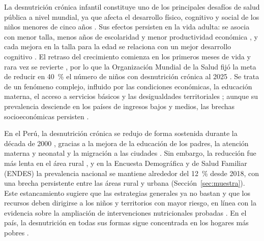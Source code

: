\documentclass[final,5p,times,twocolumn,number,lefttitle]{elsarticle}
\begin{document}
La desnutrición crónica infantil constituye uno de los principales desafíos de salud pública a nivel mundial, ya que afecta el desarrollo físico, cognitivo y social de los niños menores de cinco años \citep{black2013lancet,victora2021lancet}. Sus efectos persisten en la vida adulta: se asocia con menor talla, menos años de escolaridad y menor productividad económica \citep{victora2008consequences}, y cada mejora en la talla para la edad se relaciona con un mejor desarrollo cognitivo \citep{sudfeld2015growth}. El retraso del crecimiento comienza en los primeros meses de vida y rara vez se revierte \citep{benjaminchung2023faltering}, por lo que la Organización Mundial de la Salud fijó la meta de reducir en 40~\% el número de niños con desnutrición crónica al 2025 \citep{deonis2013who}. Se trata de un fenómeno complejo, influido por las condiciones económicas, la educación materna, el acceso a servicios básicos y las desigualdades territoriales \citep{black2013lancet}; aunque su prevalencia desciende en los países de ingresos bajos y medios, las brechas socioeconómicas persisten \citep{dasilva2018inequalities}.

En el Perú, la desnutrición crónica se redujo de forma sostenida durante la década de 2000 \citep{sobrino2014peru}, gracias a la mejora de la educación de los padres, la atención materna y neonatal y la migración a las ciudades \citep{huicho2020peru}. Sin embargo, la reducción fue más lenta en el área rural \citep{santos2021peru}, y en la Encuesta Demográfica y de Salud Familiar (ENDES) la prevalencia nacional se mantiene alrededor del 12~\% desde 2018, con una brecha persistente entre las áreas rural y urbana (Sección~\ref{sec:muestra}). Este estancamiento sugiere que las estrategias generales ya no bastan y que los recursos deben dirigirse a los niños y territorios con mayor riesgo, en línea con la evidencia sobre la ampliación de intervenciones nutricionales probadas \citep{bhutta2013interventions,scott2020ending}. En el país, la desnutrición en todas sus formas sigue concentrada en los hogares más pobres \citep{curiquinto2020peru}.
\end{document}

